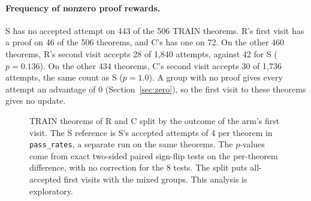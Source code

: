 \documentclass[11pt]{article}
\newcommand{\code}[1]{\texttt{#1}}
\begin{document}
\paragraph{Frequency of nonzero proof rewards.}
S has no accepted attempt on 443 of the 506 TRAIN theorems.
R's first visit has a proof on 46 of the 506 theorems, and C's has one on 72.
On the other 460 theorems, R's second visit accepts 28 of 1,840 attempts, against 42 for S ($p = 0.136$).
On the other 434 theorems, C's second visit accepts 30 of 1,736 attempts, the same count as S ($p = 1.0$).
A group with no proof gives every attempt an advantage of 0 (Section~\ref{sec:zero}), so the first visit to these theorems gives no update.

\begin{figure}[!htbp]
\centering
{}
\caption{TRAIN theorems of R and C split by the outcome of the arm's first visit. The S reference is S's accepted attempts of 4 per theorem in \code{pass\_rates}, a separate run on the same theorems. The $p$-values come from exact two-sided paired sign-flip tests on the per-theorem difference, with no correction for the 8 tests. The split puts all-accepted first visits with the mixed groups. This analysis is exploratory.}
\label{fig:oct20-signal}
\end{figure}
\end{document}
